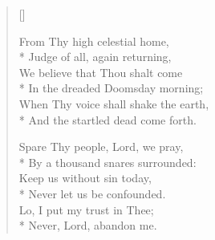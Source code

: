 \begin{verse}[\versewidth]
\begin{patverse}
From Thy high celestial home,\\*
Judge of all, again returning,\\
We believe that Thou shalt come\\*
In the dreaded Doomsday morning;\\
When Thy voice shall shake the earth,\\*
And the startled dead come forth.           
\end{patverse}


\begin{patverse}
Spare Thy people, Lord, we pray,\\*
By a thousand snares surrounded:\\
Keep us without sin today, \\*  
Never let us be confounded.\\
Lo, I put my trust in Thee;\\*
Never, Lord, abandon me. 
\end{patverse}

\end{verse}


